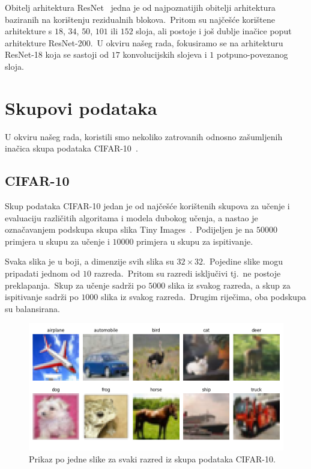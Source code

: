 \documentclass[diplomskirad]{fer}
\begin{document}
Obitelj arhitektura ResNet~\cite{he2016deep} jedna je od najpoznatijih obitelji arhitektura baziranih na korištenju rezidualnih blokova.\ 
Pritom su najčešće korištene arhitekture s $18$, $34$, $50$, $101$ ili $152$ sloja, ali postoje i još dublje inačice poput arhitekture ResNet-200.\ 
U okviru našeg rada, fokusiramo se na arhitekturu ResNet-18 koja se sastoji od $17$ konvolucijskih slojeva i $1$ potpuno-povezanog sloja.\ 

\chapter{Skupovi podataka}
\label{pog:skup}

U okviru našeg rada, koristili smo nekoliko zatrovanih odnosno zašumljenih inačica skupa podataka CIFAR-10~\cite{krizhevsky2009learning}.\

\section{CIFAR-10}
\label{sek:cifar10}

Skup podataka CIFAR-10 jedan je od najčešće korištenih skupova za učenje i evaluaciju različitih algoritama i modela dubokog učenja, a nastao je označavanjem podskupa skupa slika Tiny Images~\cite{krizhevsky2009learning}.\
Podijeljen je na $50 000$ primjera u skupu za učenje i $10 000$ primjera u skupu za ispitivanje.\ 
  
Svaka slika je u boji, a dimenzije svih slika su $32 \times 32$.\ Pojedine slike mogu pripadati jednom od $10$ razreda.\ Pritom su razredi isključivi tj.\ ne postoje preklapanja.\ 
Skup za učenje sadrži po $5000$ slika iz svakog razreda, a skup za ispitivanje sadrži po $1000$ slika iz svakog razreda.\ Drugim riječima, oba podskupa su balansirana.\ 

\begin{figure}[h]
  \centering
  \includegraphics[scale=0.6]{./Slike/cifar10.png}
  \caption{Prikaz po jedne slike za svaki razred iz skupa podataka CIFAR-10.}
  \label{fig:cifar10}
\end{figure}
\end{document}
